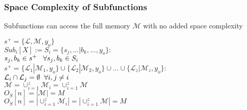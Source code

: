 \documentclass[11pt]{article}
\begin{document}
\subsubsection{Space Complexity of Subfunctions}
Subfunctions can access the full memory $\mathcal{M}$ with no added space complexity 
\begin{center}
\vspace{1mm}
$
s^+ = \{ \mathcal{L},\mathcal{M},y_o\}
$
\\ \vspace{6mm}
$
Sub_i[X] := S_i = \{s_j,...|b_k,...,y_o\}:
$
\\ \vspace{2mm}
$
s_j,b_k \in s^+ \hspace{3mm} \forall s_j,b_k \in S_i
$
\\ \vspace{6mm}
$
s^+ = \{ \mathcal{L}_1| \mathcal{M}_1,y_o\} \cup \{  \mathcal{L}_2| \mathcal{M}_2,y_o\} \cup ... \cup \{  \mathcal{L}_z| \mathcal{M}_z,y_o\} :
$
\\ \vspace{2mm}
$
\mathcal{L}_i \cap \mathcal{L}_j = \emptyset \hspace{2mm} \forall i,j\neq i
$
\\ \vspace{4mm}
$
\mathcal{M} = \cup_{i=1}^z \mathcal{M}_i  = \cup_{i=1}^z \mathcal{M}
$
\\ \vspace{4mm}
$
O_S[n] = |\mathcal{M}| = M
$
\\ \vspace{2mm}
$
O_S[n] = |\cup_{i=1}^z \mathcal{M}_i| =  |\cup_{i=1}^z \mathcal{M}| = M
$
\end{center}
\end{document}
